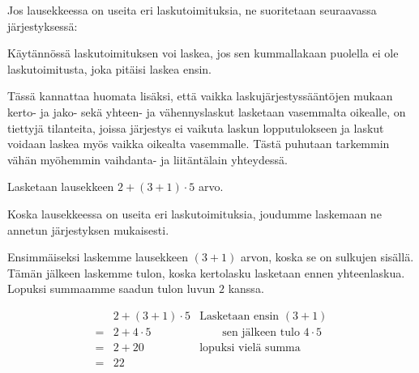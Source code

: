 Jos lausekkeessa on useita eri laskutoimituksia, ne suoritetaan seuraavassa järjestyksessä:


Käytännössä laskutoimituksen voi laskea, jos sen kummallakaan puolella ei ole laskutoimitusta, joka pitäisi laskea ensin.

Tässä kannattaa huomata lisäksi, että vaikka laskujärjestyssääntöjen mukaan kerto- ja jako- sekä yhteen- ja vähennyslaskut lasketaan vasemmalta oikealle, on tiettyjä tilanteita, joissa järjestys ei vaikuta laskun lopputulokseen ja laskut voidaan laskea myös vaikka oikealta vasemmalle. Tästä puhutaan tarkemmin vähän myöhemmin vaihdanta- ja liitäntälain yhteydessä.

\begin{esimerkki}
Lasketaan lausekkeen $2+(3+1)\cdot 5$ arvo.

Koska lausekkeessa on useita eri laskutoimituksia, joudumme laskemaan ne annetun järjestyksen mukaisesti.

Ensimmäiseksi laskemme lausekkeen $(3+1)$ arvon, koska se on sulkujen sisällä. Tämän jälkeen laskemme tulon, koska kertolasku lasketaan ennen yhteenlaskua. Lopuksi summaamme saadun tulon luvun $2$ kanssa.

\begin{align*}
   &2+(3+1)\cdot 5&\textrm{Lasketaan ensin } (3+1)
\\= &2+4\cdot5&\qquad\textrm{sen jälkeen tulo } 4\cdot 5
\\= &2+20& \textrm{lopuksi vielä summa}
\\= &22&
\end{align*}
\end{esimerkki}

%
%
%
